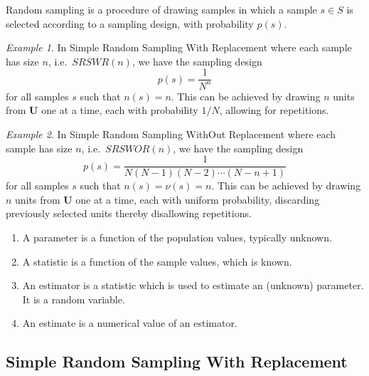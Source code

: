 \documentclass[11pt]{article}
\renewcommand{\vec}[1]{\bm{#1}}
\theoremstyle{definition}
\theoremstyle{remark}
\newtheorem*{example}{Example}
\numberwithin{equation}{section}
\begin{document}
    \begin{definition}
        Random sampling is a procedure of drawing samples in which a sample $s \in S$
        is selected according to a sampling design, with probability $p(s)$.
    \end{definition}

    \begin{example}
        In Simple Random Sampling With Replacement where each sample has size $n$,
        i.e.\ $SRSWR(n)$, we have the sampling design \[
            p(s) = \frac{1}{N^n}
        \] for all samples $s$ such that $n(s) = n$. This can be achieved by drawing
        $n$ units from $\vec{U}$ one at a time, each with probability $1 / N$,
        allowing for repetitions.
    \end{example}
    
    \begin{example}
        In Simple Random Sampling WithOut Replacement where each sample has size $n$,
        i.e.\ $SRSWOR(n)$, we have the sampling design \[
            p(s) = \frac{1}{N(N - 1)(N - 2)\cdots (N - n + 1)}
        \] for all samples $s$ such that $n(s) = \nu(s) = n$. This can be achieved by
        drawing $n$ units from $\vec{U}$ one at a time, each with uniform
        probability, discarding previously selected units thereby disallowing
        repetitions.
    \end{example}

    \begin{definition} \mbox{}
        \begin{enumerate}
            \itemsep0em
            \item A parameter is a function of the population values, typically unknown.
            \item A statistic is a function of the sample values, which is known.
            \item An estimator is a statistic which is used to estimate an (unknown)
            parameter. It is a random variable.
            \item An estimate is a numerical value of an estimator.
        \end{enumerate}
    \end{definition}


    \subsection{Simple Random Sampling With Replacement}
\end{document}
